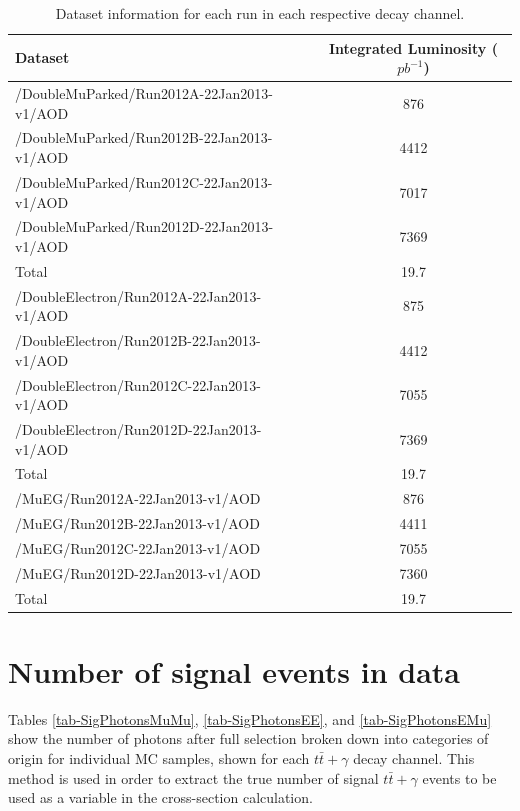 \begin{table} 
\begin{center}
\begin{tabular}{|l|c|}
\hline
	\textbf{Dataset} & \textbf{Integrated Luminosity ($pb^{-1}$)}\\
\hline
	/DoubleMuParked/Run2012A-22Jan2013-v1/AOD  & 876 \\
	/DoubleMuParked/Run2012B-22Jan2013-v1/AOD  & 4412 \\
	/DoubleMuParked/Run2012C-22Jan2013-v1/AOD  & 7017 \\
	/DoubleMuParked/Run2012D-22Jan2013-v1/AOD  & 7369 \\
\hline
	Total & 19.7\\	
\hline
	/DoubleElectron/Run2012A-22Jan2013-v1/AOD  & 875 \\
	/DoubleElectron/Run2012B-22Jan2013-v1/AOD  & 4412 \\
	/DoubleElectron/Run2012C-22Jan2013-v1/AOD  & 7055 \\
	/DoubleElectron/Run2012D-22Jan2013-v1/AOD  & 7369 \\
\hline
	Total & 19.7\\	
\hline
	/MuEG/Run2012A-22Jan2013-v1/AOD  & 876 \\
	/MuEG/Run2012B-22Jan2013-v1/AOD  & 4411 \\
	/MuEG/Run2012C-22Jan2013-v1/AOD  & 7055 \\
	/MuEG/Run2012D-22Jan2013-v1/AOD  & 7360 \\
\hline
	Total & 19.7\\	
\hline	
\end{tabular}	
\end{center}
\caption{Dataset information for each run in each respective decay channel.}
\label{tab-datasets}
\end{table}

\section{Number of signal events in data} \label{sec-SigEventsInData}

Tables \ref{tab-SigPhotonsMuMu}, \ref{tab-SigPhotonsEE}, and \ref{tab-SigPhotonsEMu} show the number of photons after full selection broken down into categories of origin for individual MC samples, shown for each $t\bar{t}+\gamma$ decay channel. This method is used in order to extract the true number of signal $t\bar{t}+\gamma$ events to be used as a variable in the cross-section calculation. 

